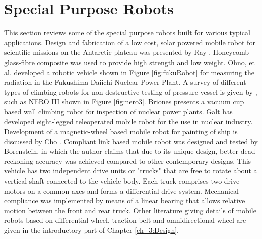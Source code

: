 \section{ Special Purpose Robots}
This section reviews some of the special purpose  robots built for various typical applications. 
Design and fabrication of a low cost, solar powered mobile robot for  scientific missions on the Antarctic plateau was presented by Ray  \cite{ray2005design}. Honeycomb-glass-fibre composite was used to provide high strength and low weight. Ohno, et al. \cite{ohno2011robotic}   developed a robotic  vehicle shown in Figure \ref{fig:fukuRobot} for measuring the radiation in the Fukushima Daiichi Nuclear Power Plant. A survey of different types of climbing robots for non-destructive testing of pressure vessel is given by \cite{luk2006tele}, such as NERO III shown in Figure \ref{fig:nero3}.  Briones \cite{briones1994wall} presents a vacuum cup based wall climbing robot for inspection of  nuclear power plants. Galt \cite{galt1997tele} has developed eight-legged teleoperated mobile robot for the use in nuclear industry. Development of a magnetic-wheel based mobile robot for painting of ship is discussed by Cho \cite{cho2013study}. Compliant link based mobile robot was designed and tested by Borenstein\cite{borenstein1995control}, in which the author claims that due to its unique design, better dead-reckoning accuracy was achieved compared to other contemporary designs. This vehicle has two independent drive units or "trucks" that are free to rotate about a vertical shaft connected to the vehicle body. Each truck comprises two drive motors on a common axes and forms a differential drive system. Mechanical compliance was implemented by means of a linear bearing that allows relative motion between the front and rear truck. Other literature giving details of  mobile robots based on   differential wheel, traction belt and omnidirectional wheel are given in the introductory part of Chapter \ref{ch_3:Design}.
